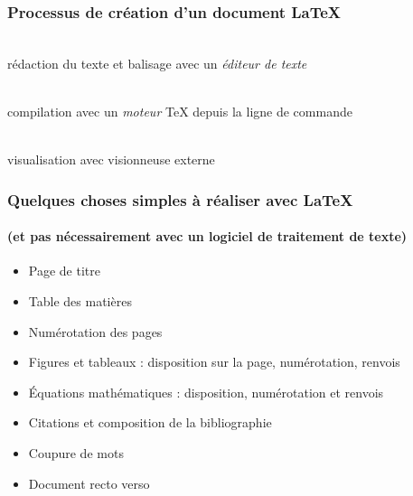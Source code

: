 
\begin{frame}[c]
	\frametitle{Processus de création d'un document {\LaTeX}}
	\Huge
	\begin{minipage}[t]{0.25\linewidth}
		\centering
		\faFileTextO \\ \bigskip
		\footnotesize
		rédaction du texte et balisage avec un \emph{éditeur de texte}
	\end{minipage}
	\hfill\faArrowRight\hfill
	\begin{minipage}[t]{0.25\linewidth}
		\centering
		\faCogs \\  \bigskip
		\footnotesize
		compilation avec un \emph{moteur} {\TeX} depuis la ligne de commande
	\end{minipage}
	\hfill\faArrowRight\hfill
	\begin{minipage}[t]{0.25\linewidth}
		\centering
		\faFilePdfO \\  \bigskip
		\footnotesize
		visualisation avec visionneuse externe
	\end{minipage}
	
\end{frame}


\begin{frame}

	\frametitle{Quelques choses simples à réaliser avec {\LaTeX}}
	\framesubtitle{(et pas nécessairement avec un logiciel de traitement de texte)}
	
	\begin{itemize}
		\item Page de titre
		\item Table des matières
		\item Numérotation des pages
		\item Figures et tableaux : disposition sur la page, numérotation, renvois
		\item Équations mathématiques : disposition, numérotation et renvois
		\item Citations et composition de la bibliographie
		\item Coupure de mots
		\item Document recto verso
	\end{itemize}

\end{frame}

